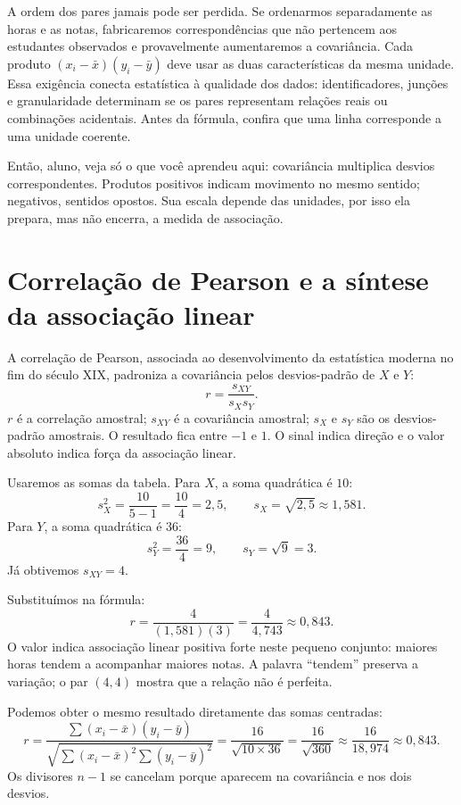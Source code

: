 A ordem dos pares jamais pode ser perdida. Se ordenarmos separadamente as horas e as notas, fabricaremos correspondências que não pertencem aos estudantes observados e provavelmente aumentaremos a covariância. Cada produto $(x_i-\bar{x})(y_i-\bar{y})$ deve usar as duas características da mesma unidade. Essa exigência conecta estatística à qualidade dos dados: identificadores, junções e granularidade determinam se os pares representam relações reais ou combinações acidentais. Antes da fórmula, confira que uma linha corresponde a uma unidade coerente.

\begin{SummaryBox}
Então, aluno, veja só o que você aprendeu aqui: covariância multiplica desvios correspondentes. Produtos positivos indicam movimento no mesmo sentido; negativos, sentidos opostos. Sua escala depende das unidades, por isso ela prepara, mas não encerra, a medida de associação.
\end{SummaryBox}

\section{Correlação de Pearson e a síntese da associação linear}

A correlação de Pearson, associada ao desenvolvimento da estatística moderna no fim do século XIX, padroniza a covariância pelos desvios-padrão de $X$ e $Y$:
\[
r=\frac{s_{XY}}{s_Xs_Y}.
\]
$r$ é a correlação amostral; $s_{XY}$ é a covariância amostral; $s_X$ e $s_Y$ são os desvios-padrão amostrais. O resultado fica entre $-1$ e $1$. O sinal indica direção e o valor absoluto indica força da associação linear.

Usaremos as somas da tabela. Para $X$, a soma quadrática é $10$:
\[
s_X^2=\frac{10}{5-1}=\frac{10}{4}=2{,}5,
\qquad
s_X=\sqrt{2{,}5}\approx1{,}581.
\]
Para $Y$, a soma quadrática é $36$:
\[
s_Y^2=\frac{36}{4}=9,
\qquad
s_Y=\sqrt9=3.
\]
Já obtivemos $s_{XY}=4$.

Substituímos na fórmula:
\[
r=\frac{4}{(1{,}581)(3)}
=\frac{4}{4{,}743}
\approx0{,}843.
\]
O valor indica associação linear positiva forte neste pequeno conjunto: maiores horas tendem a acompanhar maiores notas. A palavra ``tendem'' preserva a variação; o par $(4,4)$ mostra que a relação não é perfeita.

Podemos obter o mesmo resultado diretamente das somas centradas:
\[
r=\frac{\sum(x_i-\bar{x})(y_i-\bar{y})}
{\sqrt{\sum(x_i-\bar{x})^2\sum(y_i-\bar{y})^2}}
=\frac{16}{\sqrt{10\times36}}
=\frac{16}{\sqrt{360}}
\approx\frac{16}{18{,}974}
\approx0{,}843.
\]
Os divisores $n-1$ se cancelam porque aparecem na covariância e nos dois desvios.

